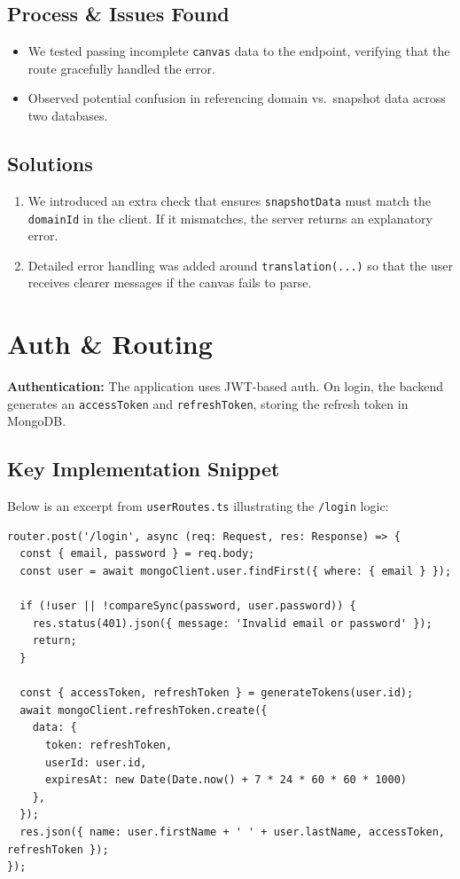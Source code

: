 \documentclass{article}
\begin{document}
\subsection{Process \& Issues Found}
\begin{itemize}
  \item We tested passing incomplete \texttt{canvas} data to the endpoint, verifying that the route gracefully handled the error.
  \item Observed potential confusion in referencing domain vs.\ snapshot data across two databases.
\end{itemize}

\subsection{Solutions}
\begin{enumerate}
  \item We introduced an extra check that ensures \texttt{snapshotData} must match the \texttt{domainId} in the client. If it mismatches, the server returns an explanatory error.
  \item Detailed error handling was added around \texttt{translation(...)} so that the user receives clearer messages if the canvas fails to parse.
\end{enumerate}

\vspace{1em}
\section{Auth \& Routing}

\textbf{Authentication:} The application uses JWT-based auth. On login, the backend generates an \texttt{accessToken} and \texttt{refreshToken}, storing the refresh token in MongoDB.

\subsection{Key Implementation Snippet}
Below is an excerpt from \texttt{userRoutes.ts} illustrating the \texttt{/login} logic:

\begin{verbatim}
router.post('/login', async (req: Request, res: Response) => {
  const { email, password } = req.body;
  const user = await mongoClient.user.findFirst({ where: { email } });

  if (!user || !compareSync(password, user.password)) {
    res.status(401).json({ message: 'Invalid email or password' });
    return;
  }

  const { accessToken, refreshToken } = generateTokens(user.id);
  await mongoClient.refreshToken.create({
    data: {
      token: refreshToken,
      userId: user.id,
      expiresAt: new Date(Date.now() + 7 * 24 * 60 * 60 * 1000)
    },
  });
  res.json({ name: user.firstName + ' ' + user.lastName, accessToken, refreshToken });
});
\end{verbatim}
\end{document}
